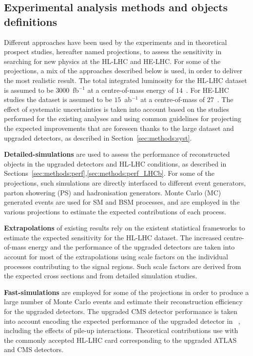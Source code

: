 
\subsection{Experimental analysis methods and objects definitions}

Different approaches have been used by the experiments and in theoretical prospect studies, hereafter named projections, to assess the sensitivity in searching for new physics at the HL-LHC and HE-LHC.
For some of the projections, a mix of the approaches described below is used, in order to deliver the most realistic result.
The total integrated luminosity for the HL-LHC dataset is assumed to be $3000$~fb$^{-1}$ at a centre-of-mass energy of $14$~\UTeV. For HE-LHC studies the dataset is assumed to be $15$~ab$^{-1}$ at a centre-of-mass of $27$~\UTeV.
The effect of systematic uncertainties is taken into account based on the studies performed for the existing analyses and using common guidelines for projecting the expected improvements that are foreseen thanks to the large dataset and upgraded detectors, as described in Section~\ref{sec:methods:syst}.

{\bf Detailed-simulations} are used to assess the performance of reconstructed objects in the upgraded detectors and HL-LHC conditions, as described in Sections~\ref{sec:methods:perf},\ref{sec:methods:perf_LHCb}.
For some of the projections, such simulations are directly interfaced to different event generators, parton showering (PS) and hadronisation generators. Monte Carlo (MC) generated events are used for SM and BSM processes, and are employed in the various projections to estimate the expected contributions of each process.

{\bf Extrapolations} of existing results rely on the existent statistical frameworks to estimate the expected sensitivity for the HL-LHC dataset.
The increased centre-of-mass energy and the performance of the upgraded detectors are taken into account for most of the extrapolations using scale factors on the individual processes contributing to the signal regions. Such scale factors are derived from the expected cross sections and from detailed simulation studies.

{\bf Fast-simulations} are employed for some of the projections in order to produce a large number of Monte Carlo events and estimate their reconstruction efficiency for the upgraded detectors. The upgraded CMS detector performance is taken into account encoding the expected performance of the upgraded detector in \delphes~\cite{deFavereau:2013fsa}, including the effects of pile-up interactions. Theoretical contributions use \delphes with the commonly accepted HL-LHC card corresponding to the upgraded ATLAS and CMS detectors.

